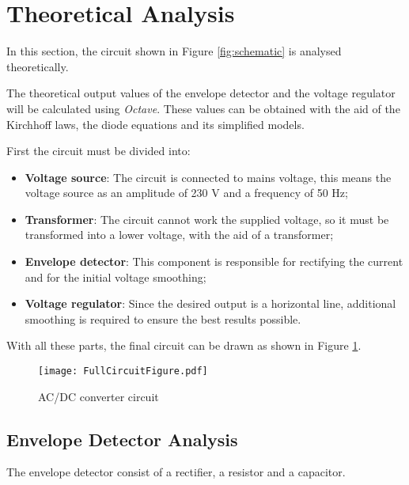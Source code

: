 \section{Theoretical Analysis}
\label{sec:analysis}
\indent


In this section, the circuit shown in Figure \ref{fig:schematic} is analysed theoretically.

The theoretical output values of the envelope detector and the voltage regulator will be calculated using {\it Octave}. These values can be obtained with the aid of the Kirchhoff laws, the diode equations and its simplified models.

First the circuit must be divided into:

\begin{itemize}
    \item \textbf{Voltage source}: The circuit is connected to mains voltage, this means the voltage source as an amplitude of 230 V and a frequency of 50 Hz;
    \item \textbf{Transformer}: The circuit cannot work the supplied voltage, so it must be transformed into a lower voltage, with the aid of a transformer;
    \item \textbf{Envelope detector}: This component is responsible for rectifying the current and for the initial voltage smoothing;
    \item \textbf{Voltage regulator}: Since the desired output is a horizontal line, additional smoothing is required to ensure the best results possible.
\end{itemize}

With all these parts, the final circuit can be drawn as shown in Figure \ref{fig:Circuit}.


\begin{figure}[h!]
    \centering
    \texttt{[image: FullCircuitFigure.pdf]}
    \caption{AC/DC converter circuit}
    \label{fig:Circuit}
\end{figure}


\subsection{Envelope Detector Analysis}
\label{subsection:ED_analysis}
\indent

The envelope detector consist of a rectifier, a resistor and a capacitor. 


